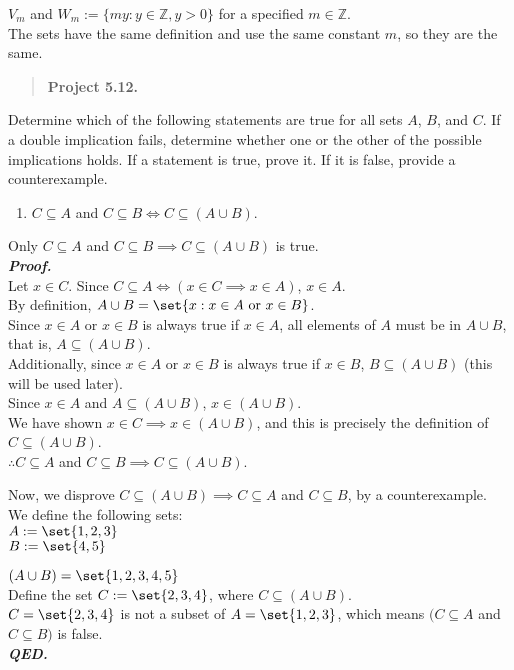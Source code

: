 \(V_m\) and \(W_m := \{my : y \in \mathbb{Z}, y > 0\}\) for a specified
\(m \in \mathbb{Z}\).\\
The sets have the same definition and use the same constant \(m\), so
they are the same.

\begin{quote}
\textbf{Project 5.12.}
\end{quote}

Determine which of the following statements are true for all sets \(A\),
\(B\), and \(C\). If a double implication fails, determine whether one
or the other of the possible implications holds. If a statement is true,
prove it. If it is false, provide a counterexample.

\begin{enumerate}
\def\labelenumi{(\roman{enumi})}
\tightlist
\item
  \(C \subseteq A\) and \(C \subseteq B \iff C \subseteq (A \cup B)\).
\end{enumerate}

Only \(C \subseteq A\) and
\(C \subseteq B \implies C \subseteq (A \cup B)\) is true.\\
\textbf{\emph{Proof.}}\\
Let \(x\in C\). Since \(C\subseteq A \iff (x\in C \implies x\in A)\),
\(x\in A\).\\
By definition, \(A\cup B=\set{x:x\in A \text{ or } x\in B}\).\\
Since \(x\in A \text{ or } x\in B\) is always true if \(x\in A\), all
elements of \(A\) must be in \(A\cup B\), that is,
\(A\subseteq (A\cup B)\).\\
Additionally, since \(x\in A \text{ or } x\in B\) is always true if
\(x\in B\), \(B\subseteq (A\cup B)\) (this will be used later).\\
Since \(x\in A\) and \(A\subseteq (A\cup B)\), \(x\in (A\cup B)\).\\
We have shown \(x\in C \implies x\in (A\cup B)\), and this is precisely
the definition of \(C\subseteq (A\cup B)\).\\
\(\therefore C \subseteq A\) and
\(C \subseteq B \implies C \subseteq (A \cup B)\).

Now, we disprove \(C \subseteq (A \cup B) \implies C \subseteq A\) and
\(C \subseteq B\), by a counterexample.\\
We define the following sets:\\
\(A:=\set{1,2,3}\)\\
\(B:=\set{4,5}\)

\((A\cup B) = \set{1,2,3,4,5}\)\\
Define the set \(C:=\set{2,3,4}\), where \(C\subseteq (A\cup B)\).\\
\(C=\set{2,3,4}\) is not a subset of \(A=\set{1,2,3}\), which means
\((C \subseteq A\) and \(C \subseteq B)\) is false.\\
\textbf{\emph{QED.}}

